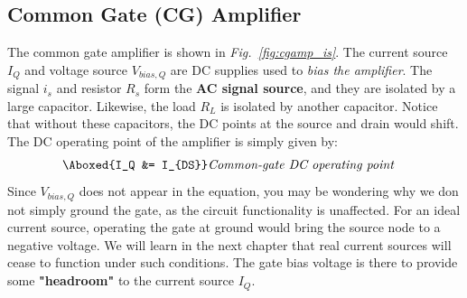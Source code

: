 \subsection{Common Gate (CG) Amplifier}
The common gate amplifier is shown in \emph{Fig.~\ref{fig:cgamp_is}}.  The current source $I_Q$ and voltage source $V_{bias,Q}$ are DC supplies used to \textit{bias the amplifier}.  The signal $i_s$ and resistor $R_s$ form the \textbf{AC signal source}, and they are isolated by a large capacitor.  Likewise, the load $R_L$ is isolated by another capacitor.  Notice that without these capacitors, the DC points at the source and drain would shift.  The DC operating point of the amplifier is simply given by:
\begin{align}
	\Aboxed{I_Q &= I_{DS}} &\textit{Common-gate DC operating point}
\end{align}
Since $V_{bias,Q}$ does not appear in the equation, you may be wondering why we don not simply ground the gate, as the circuit functionality is unaffected.  For an ideal current source, operating the gate at ground would bring the source node to a negative voltage.  We will learn in the next chapter that real current sources will cease to function under such conditions.  The gate bias voltage is there to provide some \textbf{"headroom"} to the current source $I_Q$.
